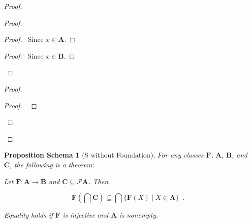 \documentclass{book}
\let\qed\relax
\newtheorem{props}[ax]{Proposition Schema}
\theoremstyle{definition}
\begin{document}
\begin{proof}
\pf
{}
\begin{proof}
	\begin{proof}
		\pf\ Since $x \in \mathbf{A}$.
	\end{proof}
	\begin{proof}
		\pf\ Since $x \in \mathbf{B}$.
	\end{proof}
\end{proof}
\begin{proof}
	\begin{proof}
		\pf\ 
	\end{proof}
\end{proof}
\qed
\end{proof}

\begin{props}[S without Foundation]
\label{prop:imgint}
For any classes $\mathbf{F}$, $\mathbf{A}$, $\mathbf{B}$, and $\mathbf{C}$, the following is a theorem:

Let $\mathbf{F} : \mathbf{A} \rightarrow \mathbf{B}$ and $\mathbf{C} \subseteq \mathcal{P} \mathbf{A}$. Then

\[ \mathbf{F} \left( \bigcap \mathbf{C} \right) \subseteq \bigcap \{ \mathbf{F}(X) \mid X \in \mathbf{A} \} \enspace . \]

Equality holds if $\mathbf{F}$ is injective and $\mathbf{A}$ is nonempty.
\end{props}
\end{document}
